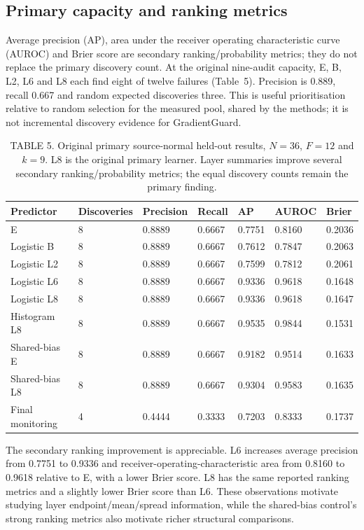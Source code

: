 \subsection{Primary capacity and ranking metrics}
Average precision (AP), area under the receiver operating characteristic curve (AUROC) and Brier score are secondary ranking/probability metrics; they do not replace the primary discovery count. At the original nine-audit capacity, E, B, L2, L6 and L8 each find eight of twelve failures (Table~5). Precision is 0.889, recall 0.667 and random expected discoveries three. This is useful prioritisation relative to random selection for the measured pool, shared by the methods; it is not incremental discovery evidence for GradientGuard.

\begin{table}[t]
\caption{TABLE 5. Original primary source-normal held-out results, $N=36$, $F=12$ and $k=9$. L8 is the original primary learner. Layer summaries improve several secondary ranking/probability metrics; the equal discovery counts remain the primary finding.}
\label{tab:primary}
\centering\small
\begin{tabular}{lllllll}
\toprule Predictor & Discoveries & Precision & Recall & AP & AUROC & Brier\\\midrule
E &8&0.8889&0.6667&0.7751&0.8160&0.2036\\
Logistic B &8&0.8889&0.6667&0.7612&0.7847&0.2063\\
Logistic L2 &8&0.8889&0.6667&0.7599&0.7812&0.2061\\
Logistic L6 &8&0.8889&0.6667&0.9336&0.9618&0.1648\\
Logistic L8 &8&0.8889&0.6667&0.9336&0.9618&0.1647\\
Histogram L8 &8&0.8889&0.6667&0.9535&0.9844&0.1531\\
Shared-bias E &8&0.8889&0.6667&0.9182&0.9514&0.1633\\
Shared-bias L8 &8&0.8889&0.6667&0.9304&0.9583&0.1635\\
Final monitoring &4&0.4444&0.3333&0.7203&0.8333&0.1737\\\bottomrule
\end{tabular}
\end{table}

The secondary ranking improvement is appreciable. L6 increases average precision from 0.7751 to 0.9336 and receiver-operating-characteristic area from 0.8160 to 0.9618 relative to E, with a lower Brier score. L8 has the same reported ranking metrics and a slightly lower Brier score than L6. These observations motivate studying layer endpoint/mean/spread information, while the shared-bias control's strong ranking metrics also motivate richer structural comparisons.

